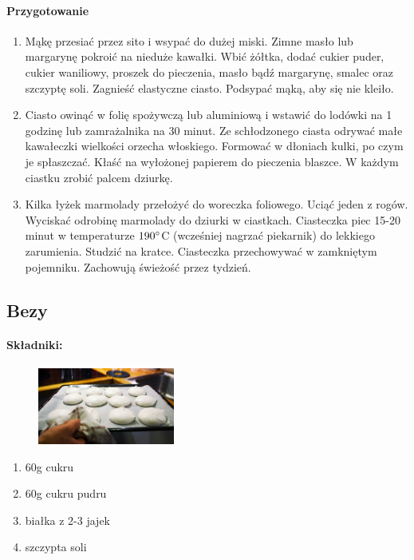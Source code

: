 \documentclass{article}
\begin{document}
    \paragraph{Przygotowanie}
    \begin{enumerate}
        \item Mąkę przesiać przez sito i wsypać do dużej miski. Zimne masło lub
            margarynę pokroić na nieduże kawałki. Wbić żółtka, dodać cukier
            puder, cukier waniliowy, proszek do pieczenia, masło bądź margarynę,
            smalec oraz szczyptę soli. Zagnieść elastyczne ciasto. Podsypać
            mąką, aby się nie kleiło.
        \item Ciasto owinąć w folię spożywczą lub aluminiową i wstawić do
            lodówki na 1 godzinę lub zamrażalnika na 30 minut. Ze schłodzonego
            ciasta odrywać małe kawałeczki wielkości orzecha włoskiego. Formować
            w dłoniach kulki, po czym je spłaszczać. Kłaść na wyłożonej papierem
            do pieczenia blaszce. W każdym ciastku zrobić palcem dziurkę.
        \item Kilka łyżek marmolady przełożyć do woreczka foliowego. Uciąć jeden
            z rogów. Wyciskać odrobinę marmolady do dziurki w ciastkach.
            Ciasteczka piec 15-20 minut w temperaturze $190\degree$C (wcześniej
            nagrzać piekarnik) do lekkiego zarumienia. Studzić na kratce.
            Ciasteczka przechowywać w zamkniętym pojemniku. Zachowują świeżość
            przez
            tydzień.
    \end{enumerate}
    \newpage

    \subsection{Bezy}
    \bigskip
    \paragraph{Składniki:}
    \begin{figure}
        \includegraphics[width=0.4\textwidth]{bezy.jpg}
    \end{figure}
    \begin{enumerate}
        \item 60g cukru
        \item 60g cukru pudru
        \item białka z 2-3 jajek
        \item szczypta soli
    \end{enumerate}
\end{document}
